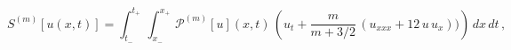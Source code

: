 \begin{equation}\label{eq:action ladder KdV}
S^{(m)}[u(x,t)] = \int_{t_-}^{t_+} \, \int_{x_-}^{x_+}
\,{\mathcal{P}}^{(m)}[u](x,t)\,\left(u_t + \frac{m}{m + 3/2}\,
(u_{xxx}+12\,u\,u_x))\right)\,dx\,dt\,,
\end{equation}

